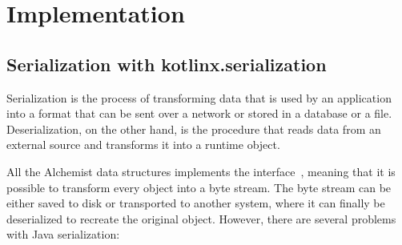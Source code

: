 \chapter{Implementation}
\label{chap:implementation}
\section{Serialization with kotlinx.serialization}
\label{sec:serialization-with-kotlinx-serialization}
Serialization is the process of transforming data that is used by an application into a format that can be sent over a network or stored in a database or a file. Deserialization, on the other hand, is the procedure that reads data from an external source and transforms it into a runtime object.\newline

All the Alchemist data structures implements the  interface~\cite{Serializ95:online}, meaning that it is possible to transform every object into a byte stream. The byte stream can be either saved to disk or transported to another system, where it can finally be deserialized to recreate the original object. However, there are several problems with Java serialization:

